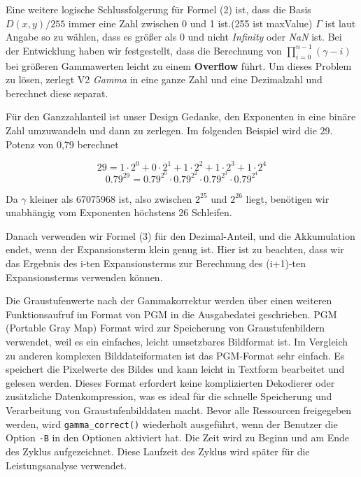 \documentclass[course=erap]{aspdoc}
\begin{document}
\par
Eine weitere logische Schlussfolgerung für Formel (2) ist, dass die Basis \(D(x,y)/255\) immer eine Zahl zwischen 0 und 1 ist.(255 ist maxValue) \emph{$\Gamma$} ist laut Angabe so zu wählen, dass es größer als 0 und nicht \emph{Infinity} oder \emph{NaN} ist. Bei der Entwicklung haben wir festgestellt, dass die Berechnung von \(\prod_{i=0}^{n-1} (\gamma-i)\) bei größeren Gammawerten leicht zu einem \textbf{Overflow} führt. Um dieses Problem zu lösen, zerlegt V2 \emph{Gamma} in eine ganze Zahl und eine Dezimalzahl und berechnet diese separat.

\par
Für den Ganzzahlanteil ist unser Design Gedanke, den Exponenten in eine binäre Zahl umzuwandeln und dann zu zerlegen. Im folgenden Beispiel wird die 29. Potenz von 0,79 berechnet

\[
29 = 1 \cdot 2^0 + 0 \cdot 2^1 + 1 \cdot 2^2 + 1 \cdot 2^3 + 1 \cdot 2^4
\]
\[
0.79^{29} = 0.79^{2^0} \cdot 0.79^{2^2} \cdot 0.79^{2^3} \cdot 0.79^{2^4}
\]

\par
Da $\gamma$ kleiner als 67075968 ist, also zwischen $2^{25}$ und $2^{26}$ liegt, benötigen wir unabhängig vom Exponenten höchstens 26 Schleifen.

\par
Danach verwenden wir Formel (3) für den Dezimal-Anteil, und die Akkumulation endet, wenn der Expansionsterm klein genug ist. Hier ist zu beachten, dass wir das Ergebnis des i-ten Expansionsterms zur Berechnung des (i+1)-ten Expansionsterms verwenden können.

\par
Die Graustufenwerte nach der Gammakorrektur werden über einen weiteren Funktionsaufruf im Format von PGM in die Ausgabedatei geschrieben. PGM (Portable Gray Map) Format\cite{netpbm} wird zur Speicherung von Graustufenbildern verwendet, weil es ein einfaches, leicht umsetzbares Bildformat ist. Im Vergleich zu anderen komplexen Bilddateiformaten ist das PGM-Format sehr einfach. Es speichert die Pixelwerte des Bildes und kann leicht in Textform bearbeitet und gelesen werden. Dieses Format erfordert keine komplizierten Dekodierer oder zusätzliche Datenkompression, was es ideal für die schnelle Speicherung und Verarbeitung von Graustufenbilddaten macht. Bevor alle Ressourcen freigegeben werden, wird \texttt{gamma\_correct()} wiederholt ausgeführt, wenn der Benutzer die Option \texttt{-B} in den Optionen aktiviert hat. Die Zeit wird zu Beginn und am Ende des Zyklus aufgezeichnet. Diese Laufzeit des Zyklus wird später für die Leistungsanalyse verwendet.
\end{document}
